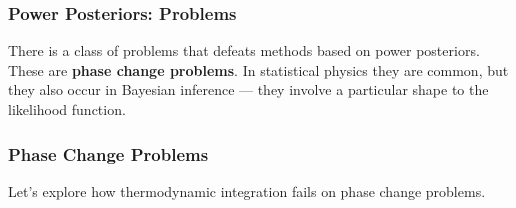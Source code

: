 \documentclass{beamer}
\begin{document}
\begin{frame}
\frametitle{Power Posteriors: Problems}
There is a class of problems that defeats methods based on power posteriors.
These are {\bf phase change problems}. In statistical physics they are common,
but they also occur in Bayesian inference --- they involve a particular
shape to the likelihood function.


\end{frame}


\begin{frame}
\frametitle{Phase Change Problems}

Let's explore how thermodynamic integration fails on phase change problems.


\end{frame}
\end{document}
